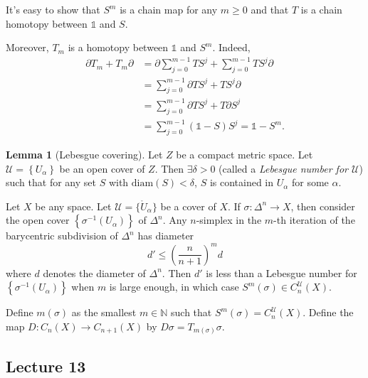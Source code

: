 \documentclass[10pt,letterpaper,cm]{nupset}
\theoremstyle{definition}
\theoremstyle{theorem}
\newtheorem{lemma}[definition]{Lemma}
\theoremstyle{remark}
\newcommand{\N}{\mathbb N}
\newcommand{\U}{\mathcal U}
\newcommand{\1}{\mathbb{1}}
\newcommand{\0}{\vec 0}
\begin{document}
It's easy to show that $S^m$ is a chain map for any $m\geq 0$ and that $T$ is a chain homotopy between $\1$ and $S$.

\medskip

Moreover, $T_m$ is a homotopy between $\1$ and $S^m$. Indeed,
\begin{align*}
 \partial{T_m} +T_m{\partial} & = \partial{ \sum_{j=0}^{m-1} TS^j} + \sum_{j=0}^{m-1} TS^j{\partial} 
 \\ & = \sum_{j=0}^{m-1} \partial{TS^j} +TS^j{\partial}
 \\ & =  \sum_{j=0}^{m-1} \partial{TS^j} +T\partial{S^j}
 \\ & = \sum_{j=0}^{m-1}(\1 -S)S^j = \1 - S^m.
\end{align*}


\begin{lemma}[Lebesgue covering]
Let $Z$ be a compact metric space. Let $\U =\left\{U_{\alpha}\right\}$ be an open cover of $Z$. Then $\exists \delta >0$ (called a \textit{Lebesgue number for $\U$}) such that for any set $S$ with $\text{diam}(S) < \delta$, $S$ is contained in $U_{\alpha}$ for some $\alpha$.
\end{lemma}

\smallskip

Let $X$ be any space.  Let $\U =\{\mathring{U}_{\alpha}\}$ be a cover of $X$. If $\sigma : \Delta^n \to X$, then consider the open cover $\left\{ \sigma^{-1}(U_{\alpha})\right\} $ of $\Delta^n$. Any $n$-simplex in the $m$-th iteration of the barycentric subdivision of $\Delta^n$ has diameter $$d' \leq \left(\frac{n}{n+1}\right)^md$$ where $d$ denotes the diameter of $\Delta^n$. Then $d'$ is less than a Lebesgue number for $\left\{ \sigma^{-1}(U_{\alpha})\right\}$ when $m$ is large enough, in which case $S^m(\sigma) \in C_n^{\U}(X)$.

Define $m(\sigma)$ as the smallest $m\in \N$ such that $S^m(\sigma) =C_n^{\U}(X)$. Define the map $D: C_n(X) \to  C_{n+1}(X)$ by $D{\sigma} =T_{m(\sigma)}{\sigma}$.


\subsection{Lecture 13}
\end{document}
